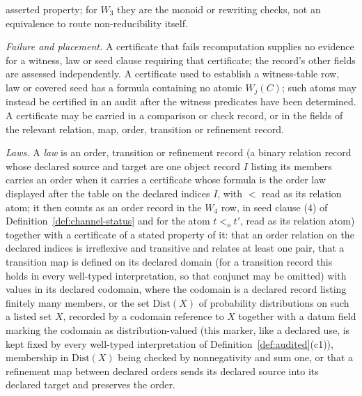 asserted property; for \(W_3\) they are the monoid or rewriting checks, not an
equivalence to route non-reducibility itself. \par\emph{Failure and placement.} A certificate that fails recomputation supplies no
evidence for a witness, law or seed clause requiring that certificate; the
record's other fields are assessed independently. A certificate used to
establish a witness-table row, law or covered seed has a formula containing no
atomic \(W_j(C)\); such atoms may instead be certified in an audit after the
witness predicates have been determined. A certificate may be
carried in a comparison or check record, or in the fields of the relevant
relation, map, order, transition or refinement record.
\par\emph{Laws.} A \emph{law} is an
order, transition or refinement record (a binary relation record whose declared source and target are one object record \(I\) listing its members carries an order when it carries a certificate whose formula is the order law displayed after the table on the declared indices \(I\), with \(<\) read as its relation atom; it then counts as an order record in the \(W_4\) row, in seed
clause (4) of Definition~\ref{def:channel-status} and for the atom
\(t<_o t'\), read as its relation atom) together with a certificate of a stated property of it: that an order relation on the
declared indices is irreflexive and transitive and relates at least one pair, that a transition map is
defined on its declared domain (for a transition record this holds in every well-typed interpretation, so that conjunct may be omitted) with values in its declared codomain, where the
codomain is a declared record listing finitely many members, or the set
\(\mathrm{Dist}(X)\) of probability distributions on such a listed set \(X\), recorded by a codomain
reference to \(X\) together with a datum field marking the codomain as
distribution-valued (this marker, like a declared use, is kept fixed by every
well-typed interpretation of Definition~\ref{def:audited}(c1)),
membership in \(\mathrm{Dist}(X)\) being checked by nonnegativity and sum one,
or that a
refinement map between declared orders sends its declared source into its declared target and preserves the order.

